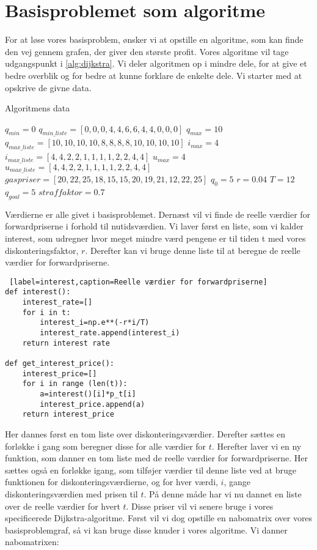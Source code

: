 \section{Basisproblemet som algoritme}
For at løse vores basisproblem, ønsker vi at opstille en algoritme, som kan finde den vej gennem grafen, der giver den største profit. Vores algoritme vil tage udgangspunkt i \autoref{alg:dijkstra}. Vi deler algoritmen op i mindre dele, for at give et bedre overblik og for bedre at kunne forklare de enkelte dele. Vi starter med at opskrive de givne data. 

\begin{algorithm}[H] 
\caption{Algoritmens data}
\begin{algorithmic}[1]
\State $q_{min}=0$
\State $q_{min\_liste}=[0,0,0,4,4,6,6,4,4,0,0,0]$
\State $q_{max}=10$
\State $q_{max\_liste}=[10,10,10,10,8,8,8,8,10,10,10,10]$
\State $i_{max}=4$
\State $i_{max\_liste}=[4,4,2,2,1,1,1,1,2,2,4,4]$
\State $u_{max}=4$
\State $u_{max\_liste}=[4,4,2,2,1,1,1,1,2,2,4,4]$
\State $gaspriser=[20,22,25,18,15,15,20,19,21,12,22,25]$
\State $q_{0}=5$
\State $r=0.04$
\State $T=12$
\State $q_{goal}=5$
\State $straffaktor=0.7$

\end{algorithmic}
\label{alg:basis}
\end{algorithm}

Værdierne er alle givet i basisproblemet.
Dernæst vil vi finde de reelle værdier for forwardpriserne i forhold til nutidsværdien. Vi laver først en liste, som vi kalder interest, som udregner hvor meget mindre værd pengene er til tiden t med vores diskonteringsfaktor, $r$. Derefter kan vi bruge denne liste til at beregne de reelle værdier for forwardpriserne.

\begin{lstlisting} [label=interest,caption=Reelle værdier for forwardpriserne]
def interest():
	interest_rate=[]
	for i in t:
		interest_i=np.e**(-r*i/T)
		interest_rate.append(interest_i)
	return interest rate
	
def get_interest_price():
	interest_price=[]
	for i in range (len(t)):
		a=interest()[i]*p_t[i]
		interest_price.append(a)
	return interest_price

\end{lstlisting}
Her dannes først en tom liste over diskonteringsværdier. Derefter sættes en forløkke i gang som beregner disse for alle værdier for $t$. Herefter laver vi en ny funktion, som danner en tom liste med de reelle værdier for forwardpriserne. Her sættes også en forløkke igang, som tilføjer værdier til denne liste ved at bruge funktionen for diskonteringsværdierne, og for hver værdi, $i$, gange diskonteringsværdien med prisen til $t$. På denne måde har vi nu dannet en liste over de reelle værdier for hvert $t$. Disse priser vil vi senere bruge i vores specificerede Dijkstra-algoritme. Først vil vi dog opstille en nabomatrix over vores basisproblemgraf, så vi kan bruge disse knuder i vores algoritme. Vi danner nabomatrixen:

